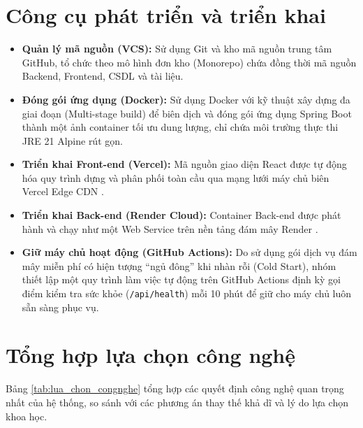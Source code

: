 \section{Công cụ phát triển và triển khai}
\label{sec:cn_devops}

\begin{itemize}
    \item \textbf{Quản lý mã nguồn (VCS):} Sử dụng Git và kho mã nguồn trung tâm GitHub, tổ chức theo mô hình đơn kho (Monorepo) chứa đồng thời mã nguồn Backend, Frontend, CSDL và tài liệu.
    \item \textbf{Đóng gói ứng dụng (Docker):} Sử dụng Docker với kỹ thuật xây dựng đa giai đoạn (Multi-stage build) để biên dịch và đóng gói ứng dụng Spring Boot thành một ảnh container tối ưu dung lượng, chỉ chứa môi trường thực thi JRE 21 Alpine rút gọn.
    \item \textbf{Triển khai Front-end (Vercel):} Mã nguồn giao diện React được tự động hóa quy trình dựng và phân phối toàn cầu qua mạng lưới máy chủ biên Vercel Edge CDN \cite{vercel_docs}.
    \item \textbf{Triển khai Back-end (Render Cloud):} Container Back-end được phát hành và chạy như một Web Service trên nền tảng đám mây Render \cite{render_docs}.
    \item \textbf{Giữ máy chủ hoạt động (GitHub Actions):} Do sử dụng gói dịch vụ đám mây miễn phí có hiện tượng ``ngủ đông'' khi nhàn rỗi (Cold Start), nhóm thiết lập một quy trình làm việc tự động trên GitHub Actions định kỳ gọi điểm kiểm tra sức khỏe (\texttt{/api/health}) mỗi 10 phút để giữ cho máy chủ luôn sẵn sàng phục vụ.
\end{itemize}

\section{Tổng hợp lựa chọn công nghệ}
\label{sec:tonghop_congnghe}

Bảng \ref{tab:lua_chon_congnghe} tổng hợp các quyết định công nghệ quan trọng nhất của hệ thống, so sánh với các phương án thay thế khả dĩ và lý do lựa chọn khoa học.

